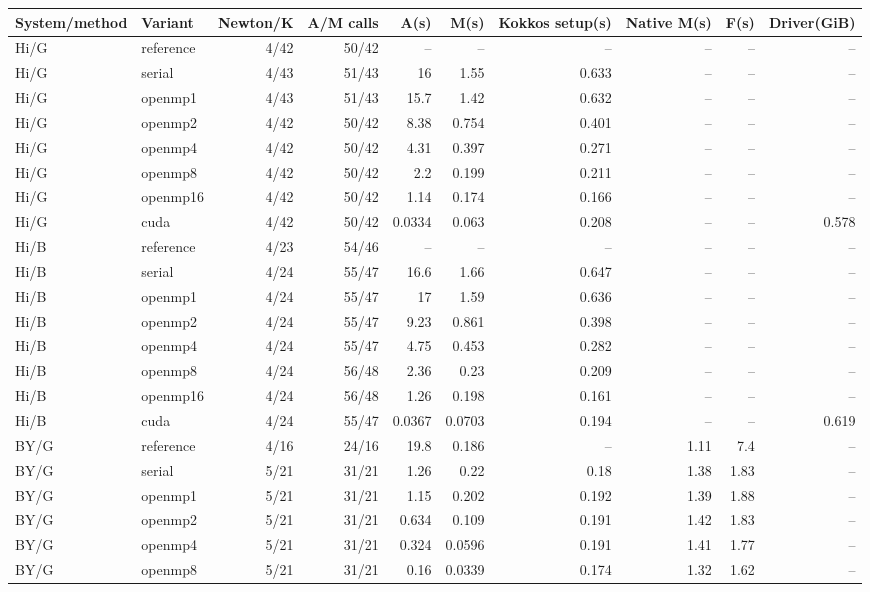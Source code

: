 \documentclass[11pt]{article}
\begin{document}
\scriptsize\begin{longtable}{llrrrrrrrr}
\toprule System/method & Variant & Newton/K & A/M calls & A(s) & M(s) & Kokkos setup(s) & Native M(s) & F(s) & Driver(GiB)\\
\midrule\endhead
Hi/G & reference & 4/42 & 50/42 & -- & -- & -- & -- & -- & --\\
Hi/G & serial & 4/43 & 51/43 & 16 & 1.55 & 0.633 & -- & -- & --\\
Hi/G & openmp1 & 4/43 & 51/43 & 15.7 & 1.42 & 0.632 & -- & -- & --\\
Hi/G & openmp2 & 4/42 & 50/42 & 8.38 & 0.754 & 0.401 & -- & -- & --\\
Hi/G & openmp4 & 4/42 & 50/42 & 4.31 & 0.397 & 0.271 & -- & -- & --\\
Hi/G & openmp8 & 4/42 & 50/42 & 2.2 & 0.199 & 0.211 & -- & -- & --\\
Hi/G & openmp16 & 4/42 & 50/42 & 1.14 & 0.174 & 0.166 & -- & -- & --\\
Hi/G & cuda & 4/42 & 50/42 & 0.0334 & 0.063 & 0.208 & -- & -- & 0.578\\
Hi/B & reference & 4/23 & 54/46 & -- & -- & -- & -- & -- & --\\
Hi/B & serial & 4/24 & 55/47 & 16.6 & 1.66 & 0.647 & -- & -- & --\\
Hi/B & openmp1 & 4/24 & 55/47 & 17 & 1.59 & 0.636 & -- & -- & --\\
Hi/B & openmp2 & 4/24 & 55/47 & 9.23 & 0.861 & 0.398 & -- & -- & --\\
Hi/B & openmp4 & 4/24 & 55/47 & 4.75 & 0.453 & 0.282 & -- & -- & --\\
Hi/B & openmp8 & 4/24 & 56/48 & 2.36 & 0.23 & 0.209 & -- & -- & --\\
Hi/B & openmp16 & 4/24 & 56/48 & 1.26 & 0.198 & 0.161 & -- & -- & --\\
Hi/B & cuda & 4/24 & 55/47 & 0.0367 & 0.0703 & 0.194 & -- & -- & 0.619\\
BY/G & reference & 4/16 & 24/16 & 19.8 & 0.186 & -- & 1.11 & 7.4 & --\\
BY/G & serial & 5/21 & 31/21 & 1.26 & 0.22 & 0.18 & 1.38 & 1.83 & --\\
BY/G & openmp1 & 5/21 & 31/21 & 1.15 & 0.202 & 0.192 & 1.39 & 1.88 & --\\
BY/G & openmp2 & 5/21 & 31/21 & 0.634 & 0.109 & 0.191 & 1.42 & 1.83 & --\\
BY/G & openmp4 & 5/21 & 31/21 & 0.324 & 0.0596 & 0.191 & 1.41 & 1.77 & --\\
BY/G & openmp8 & 5/21 & 31/21 & 0.16 & 0.0339 & 0.174 & 1.32 & 1.62 & --\\

\end{longtable}
\end{document}

